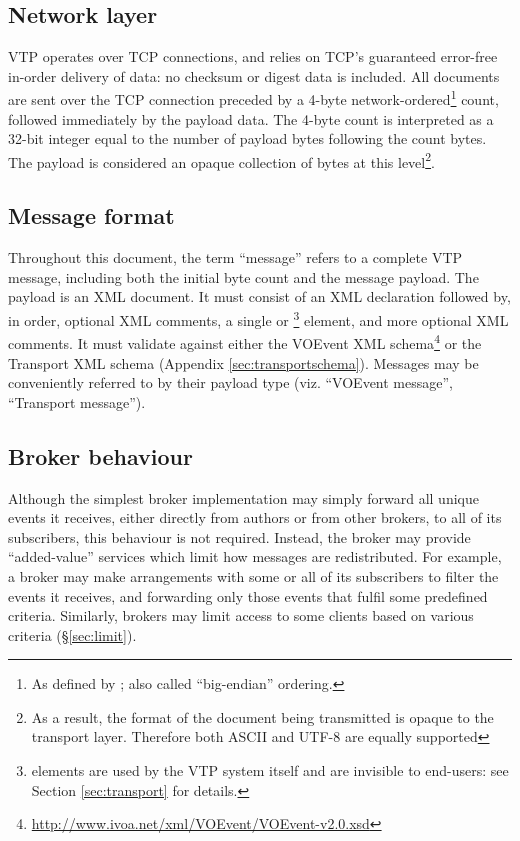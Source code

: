 \documentclass[a4paper,11pt]{ivoa}
\begin{document}
\subsection{Network layer}

VTP operates over TCP \citep{Cerf:1974} connections, and relies on TCP's
guaranteed error-free in-order delivery of data: no checksum or digest data is
included. All documents are sent over the TCP connection preceded by a 4-byte
network-ordered\footnote{As defined by \citet{Reynolds:1994}; also called
``big-endian'' ordering.} count, followed immediately by the payload data. The
4-byte count is interpreted as a 32-bit integer equal to the number of payload
bytes following the count bytes. The payload is considered an opaque
collection of bytes at this level\footnote{As a result, the format of the
document being transmitted is opaque to the transport layer. Therefore both
ASCII and UTF-8 are equally supported}.

\subsection{Message format}
\label{sec:common:format}

Throughout this document, the term ``message'' refers to a complete VTP
message, including both the initial byte count and the message payload.  The
payload is an XML document. It must consist of an XML declaration followed by,
in order, optional XML comments, a single  or
\footnote{  elements are used by
the VTP system itself and are invisible to end-users: see Section
\ref{sec:transport} for details.} element, and more optional XML comments. It
must validate against either the VOEvent XML
schema\footnote{\url{http://www.ivoa.net/xml/VOEvent/VOEvent-v2.0.xsd}} or the
Transport XML schema (Appendix \ref{sec:transportschema}). Messages may be
conveniently referred to by their payload type (viz. ``VOEvent message'',
``Transport message'').

\subsection{Broker behaviour}
\label{sec:common:broker}

Although the simplest broker implementation may simply forward all unique
events it receives, either directly from authors or from other brokers, to all
of its subscribers, this behaviour is not required. Instead, the broker may
provide ``added-value'' services which limit how messages are redistributed.
For example, a broker may make arrangements with some or all of its
subscribers to filter the events it receives, and forwarding only those events
that fulfil some predefined criteria. Similarly, brokers may limit access to
some clients based on various criteria (\S\ref{sec:limit}).
\end{document}
